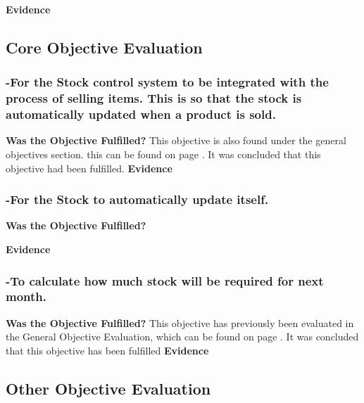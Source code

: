 \textbf{Evidence} \newline


\subsection{Core Objective Evaluation}

\subsubsection{-For the Stock control system to be integrated with the process of selling items. This is so that the stock is automatically updated when a product is sold.}
\textbf{Was the Objective Fulfilled?} \newline
This objective is also found under the general objectives section. this can be found on page \pageref{-For the Stock control system to be integrated with the process of selling items. This is so that the stock is automatically updated when a product is sold.} . It was concluded that this objective had been fulfilled.
\textbf{Evidence} \newline



\subsubsection{-For the Stock to automatically update itself.}
\textbf{Was the Objective Fulfilled?} \newline

\textbf{Evidence} \newline




\subsubsection{-To calculate how much stock will be required for next month.}
\textbf{Was the Objective Fulfilled?} \newline
This objective has previously been evaluated in the General Objective Evaluation, which can be found on page \pageref{stock-eval}. It was concluded that this objective has been fulfilled
\textbf{Evidence} \newline



\subsection{Other Objective Evaluation}



